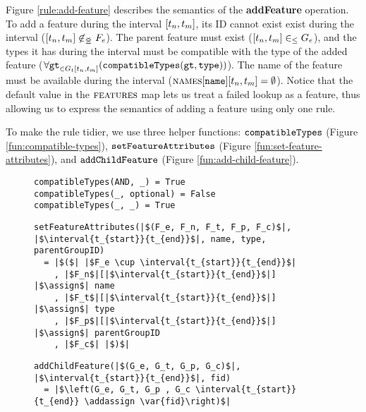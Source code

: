 Figure \vref{rule:add-feature}  describes the semantics of the \textbf{addFeature} operation. 
To add a feature during the interval $\interval{t_n}{t_m}$, its ID cannot exist exist during the interval ($\interval{t_n}{t_m} \not \innr F_e$). The parent feature must exist ($\interval{t_n}{t_m} \inn G_e$), and the types it has during the interval must be compatible with the type of the 
added feature ($\forall \var{gt}_{\in G_t\interval{t_n}{t_m}} (\var{compatibleTypes}(\var{gt}, \var{type}))$). The name of the feature must be available during the interval ($\names{}[\var{name}]\interval{t_n}{t_m} = \emptyset$). Notice that the default value in the $\textsc{features}{}$ map lets us treat a failed lookup as a feature, thus allowing us to express the semantics of adding a feature using only one rule. 

To make the rule tidier, we use three helper functions: $\texttt{compatibleTypes}$ (Figure \vref{fun:compatible-types}), $\texttt{setFeatureAttributes}$ (Figure \vref{fun:set-feature-attributes}), and $\texttt{addChildFeature}$ (Figure \vref{fun:add-child-feature}). 

\begin{figure}[h]
  \begin{verbatim}
compatibleTypes(AND, _) = True
compatibleTypes(_, optional) = False
compatibleTypes(_, _) = True
  \end{verbatim}
  \caption{\label{fun:compatible-types}}
\end{figure}

\begin{figure}[h]
  \begin{verbatim}
setFeatureAttributes(|$(F_e, F_n, F_t, F_p, F_c)$|, |$\interval{t_{start}}{t_{end}}$|, name, type, parentGroupID)
  = |$($| |$F_e \cup \interval{t_{start}}{t_{end}}$|
    , |$F_n$|[|$\interval{t_{start}}{t_{end}}$|] |$\assign$| name
    , |$F_t$|[|$\interval{t_{start}}{t_{end}}$|] |$\assign$| type
    , |$F_p$|[|$\interval{t_{start}}{t_{end}}$|] |$\assign$| parentGroupID
    , |$F_c$| |$)$|
     \end{verbatim}
  \caption{\label{fun:set-feature-attributes}}
\end{figure}

\begin{figure}[h]
  \begin{verbatim}
addChildFeature(|$(G_e, G_t, G_p, G_c)$|, |$\interval{t_{start}}{t_{end}}$|, fid)
  = |$\left(G_e, G_t, G_p , G_c \interval{t_{start}}{t_{end}} \addassign \var{fid}\right)$|
  \end{verbatim}
  \caption{\label{fun:add-child-feature}}
\end{figure}


